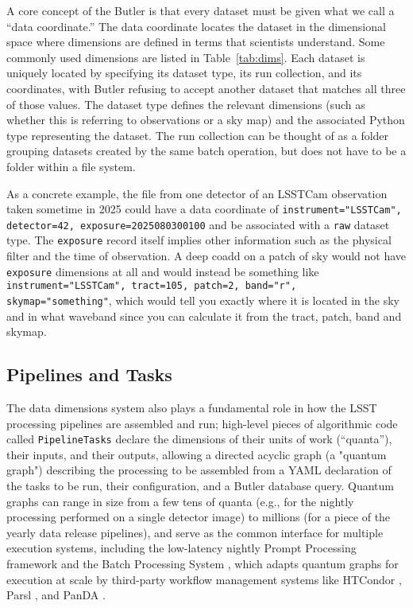 A core concept of the Butler is that every dataset must be given what we call a ``data coordinate.''
The data coordinate locates the dataset in the dimensional space where dimensions are defined in terms that scientists understand.
Some commonly used dimensions are listed in Table~\ref{tab:dims}.
Each dataset is uniquely located by specifying its dataset type, its run collection, and its coordinates, with Butler refusing to accept another dataset that matches all three of those values.
The dataset type defines the relevant dimensions (such as whether this is referring to observations or a sky map) and the associated Python type representing the dataset.
The run collection can be thought of as a folder grouping datasets created by the same batch operation, but does not have to be a folder within a file system.

As a concrete example, the file from one detector of an LSSTCam observation taken sometime in 2025 could have a data coordinate of \texttt{instrument="LSSTCam", detector=42, exposure=2025080300100} and be associated with a \texttt{raw} dataset type.
The \texttt{exposure} record itself implies other information such as the physical filter and the time of observation.
A deep coadd on a patch of sky would not have \texttt{exposure} dimensions at all and would instead be something like \texttt{instrument="LSSTCam", tract=105, patch=2, band="r", skymap="something"}, which would tell you exactly where it is located in the sky and in what waveband since you can calculate it from the tract, patch, band and skymap.

\subsection{Pipelines and Tasks}

The data dimensions system also plays a fundamental role in how the LSST processing pipelines are assembled and run; high-level pieces of algorithmic code called \texttt{PipelineTasks} declare the dimensions of their units of work (``quanta''), their inputs, and their outputs, allowing a directed acyclic graph (a "quantum graph") describing the processing to be assembled from a YAML declaration of the tasks to be run, their configuration, and a Butler database query.
Quantum graphs can range in size from a few tens of quanta (e.g., for the nightly processing performed on a single detector image) to millions (for a piece of the yearly data release pipelines), and serve as the common interface for multiple execution systems, including the low-latency nightly Prompt Processing framework \citep{DMTN-219} and the Batch Processing System \citep[BPS;][]{2022arXiv221115795G}, which adapts quantum graphs for execution at scale by third-party workflow management systems like HTCondor \citep{2024zndo..14238973H}, Parsl \citep{10.1145/3307681.3325400}, and PanDA \citep{2024EPJWC.29504026K}.

